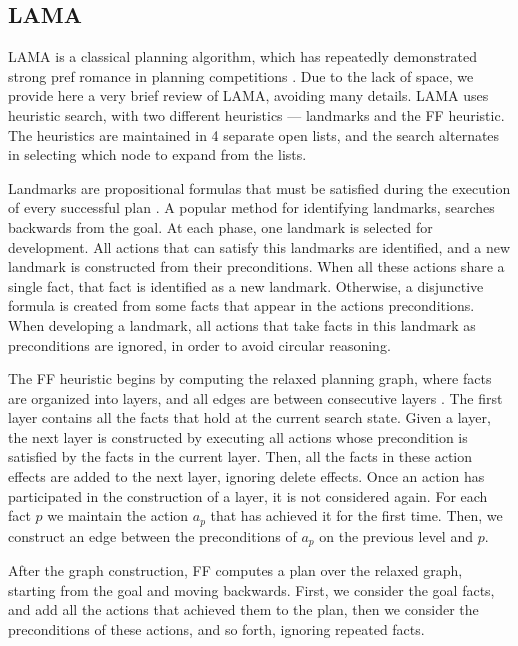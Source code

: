 \documentclass[letterpaper]{article}
\theoremstyle{definition}
\begin{document}
\subsection{LAMA}

LAMA is a classical planning algorithm, which has repeatedly demonstrated strong pref romance in planning competitions \citep{richter2010lama}. Due to the lack of space, we provide here a very brief review of LAMA, avoiding many details. LAMA uses heuristic search, with two different heuristics --- landmarks and the FF heuristic. The heuristics are maintained in 4 separate open lists, and the search alternates in selecting which node to expand from the lists.

Landmarks are propositional formulas that must be satisfied during the execution of every successful plan \citep{richter2008landmarks}. A popular method for identifying landmarks, searches backwards from the goal. At each phase, one landmark is selected for development. All actions that can satisfy this landmarks are identified, and a new landmark is constructed from their preconditions. When all these actions share a single fact, that fact is identified as a new landmark. Otherwise, a disjunctive formula is created from some facts that appear in the actions preconditions. When developing a landmark, all actions that take facts in this landmark as preconditions are ignored, in order to avoid circular reasoning.

The FF heuristic begins by computing the relaxed planning graph, where facts are organized into layers, and all edges are between consecutive layers \citep{hoffmann2001ff}. The first layer contains all the facts that hold at the current search state. Given a layer, the next layer is constructed by executing all actions whose precondition is satisfied by the facts in the current layer. Then, all the facts in these action effects are added to the next layer, ignoring delete effects. Once an action has participated in the construction of a layer, it is not considered again. For each fact $p$ we maintain the action $a_p$ that has achieved it for the first time. Then, we construct an edge between the preconditions of $a_p$ on the previous level and $p$.

After the graph construction, FF computes a plan over the relaxed graph, starting from the goal and moving backwards. First, we consider the goal facts, and add all the actions that achieved them to the plan, then we consider the preconditions of these actions, and so forth, ignoring repeated facts.
\end{document}
